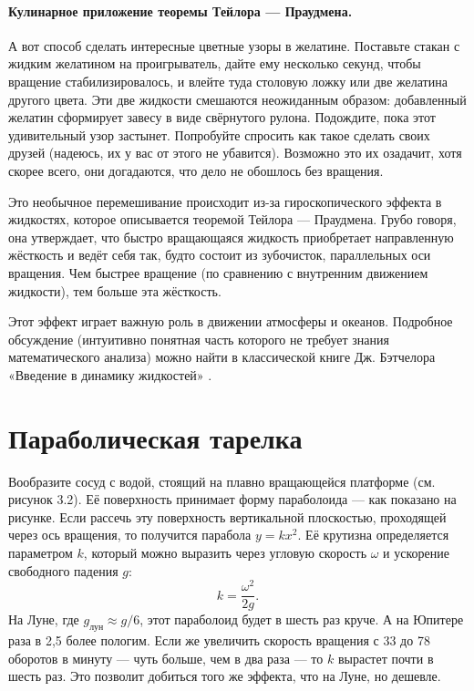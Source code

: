 \paragraph{Кулинарное приложение теоремы Тейлора --- Праудмена.} %
А вот способ сделать интересные цветные узоры в желатине.
Поставьте стакан с жидким желатином на проигрыватель, дайте ему несколько секунд, чтобы вращение стабилизировалось, и влейте туда столовую ложку или две желатина другого цвета.
Эти две жидкости смешаются неожиданным образом: добавленный желатин сформирует завесу в виде свёрнутого рулона.
Подождите, пока этот удивительный узор застынет.
Попробуйте спросить как такое сделать своих друзей (надеюсь, их у вас от этого не убавится).
Возможно это их озадачит, хотя скорее всего, они догадаются, что дело не обошлось без вращения.

Это необычное перемешивание происходит из-за гироскопического эффекта в жидкостях, которое описывается теоремой Тейлора --- Праудмена.
Грубо говоря, она утверждает, что быстро вращающаяся жидкость приобретает направленную жёсткость и ведёт себя так, будто состоит из зубочисток, параллельных оси вращения.
Чем быстрее вращение (по сравнению с внутренним движением жидкости), тем больше эта жёсткость.

Этот эффект играет важную роль в движении атмосферы и океанов.
Подробное обсуждение (интуитивно понятная часть которого не требует знания математического анализа) можно найти в классической книге Дж. Бэтчелора «Введение в динамику жидкостей» \cite{batchelor1967}.

\section{Параболическая тарелка}

Вообразите сосуд с водой, стоящий на плавно вращающейся платформе (см. рисунок 3.2).
Её поверхность принимает форму параболоида — как показано на рисунке.
Если рассечь эту поверхность вертикальной плоскостью, проходящей через ось вращения, то получится парабола $y = kx^2$.
Её крутизна определяется параметром $k$, который можно выразить через угловую скорость $\omega$ и ускорение свободного падения $g$:
\begin{equation}
k = \frac{\omega^2}{2g}.
\label{eq:3.1}
\end{equation}
На Луне, где $g_{\text{лун}} \approx g/6$, этот параболоид будет в шесть раз круче.
А на Юпитере раза в 2{,}5 более пологим.
Если же увеличить скорость вращения с 33 до 78 оборотов в минуту — чуть больше, чем в два раза — то $k$ вырастет почти в шесть раз.
Это позволит добиться того же эффекта, что на Луне, но дешевле.

